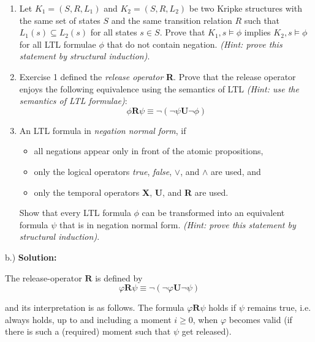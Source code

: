 
\begin{enumerate}

\item Let $K_1 = (S, R, L_1)$ and  $K_2 = (S, R, L_2)$ be two Kripke structures with the same set of states $S$ and the same transition relation $R$ such that $L_1(s) \subseteq L_2(s)$ for all states $s \in S$.
    Prove that $K_1,s \models \phi$ implies $K_2,s \models \phi$ for all LTL formulae $\phi$ that do not contain negation.
    \emph{(Hint: prove this statement by structural induction)}.

\item

Exercise 1 defined the \emph{release operator} \textbf{R}.
Prove that the release operator enjoys the following equivalence using the semantics of LTL \emph{(Hint: use the semantics of LTL formulae)}:
\begin{displaymath}
    \phi \mathbf{R} \psi \equiv \neg(\neg \psi \mathbf{U} \neg \phi)
\end{displaymath}

\item

An LTL formula in \emph{negation normal form}, if
\begin{itemize}
\item all negations appear only in front of the atomic propositions,
\item only the logical operators \emph{true}, \emph{false}, $\vee$, and $\wedge$ are used, and
\item only the temporal operators \textbf{X}, \textbf{U}, and \textbf{R} are used.
\end{itemize}

Show that every LTL formula $\phi$ can be transformed into an equivalent formula $\psi$ that is in negation normal form.
\emph{(Hint: prove this statement by structural induction)}.

\end{enumerate}

b.)
\textbf{Solution:}

\bigskip

The release-operator $\mathbf{R}$ is defined by%
\begin{equation}
\varphi \mathbf{R}\psi \equiv \lnot (\lnot \varphi \mathbf{U\lnot }\psi )
\label{release_op}
\end{equation}

and its interpretation is as follows. The formula $\varphi \mathbf{R}\psi $
holds if $\psi $ remains true, i.e. always holds, up to and including a
moment $i\geq 0$, when $\varphi $ becomes valid (if there is such a
(required) moment such that $\psi $ get released).

